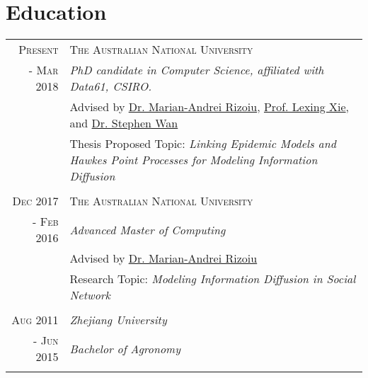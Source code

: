 \documentclass[a4paper,10pt]{article}
\newcommand{\tabitem}{~~\llap{\textbullet}~~}
\begin{document}
\section{Education}
\begin{tabular}{r|p{11cm}}
 \textsc{Present} & \textsc{The Australian National University} \\
 \textsc{- Mar 2018}&\emph{PhD candidate in Computer Science, affiliated with Data61, CSIRO. }\\
 &\footnotesize{Advised by \href{http://rizoiu.eu/}{Dr. Marian-Andrei Rizoiu}, \href{http://users.cecs.anu.edu.au/~xlx/}{Prof. Lexing Xie}, and \href{https://people.csiro.au/W/S/Stephen-Wan}{Dr. Stephen Wan}} \\
 &\footnotesize{Thesis Proposed Topic: \textit{Linking Epidemic Models and Hawkes Point Processes for Modeling Information Diffusion}} \\
 \multicolumn{2}{c}{} \\
 
 \textsc{Dec 2017} & \textsc{The Australian National University} \\\textsc{- Feb 2016}&\emph{Advanced Master of Computing}\\&\footnotesize{Advised by \href{http://rizoiu.eu/}{Dr. Marian-Andrei Rizoiu}} \\
 &\footnotesize{Research Topic: \textit{Modeling Information Diffusion in Social Network}} \\
 \multicolumn{2}{c}{} \\
 
 \textsc{Aug 2011} & \emph{Zhejiang University} \\ \textsc{- Jun 2015} & \emph{Bachelor of Agronomy} \\\multicolumn{2}{c}{} \\
\end{tabular}


\end{document}
